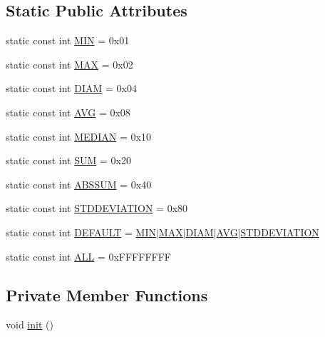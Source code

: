 \subsection*{Static Public Attributes}
\begin{CompactItemize}
\item 
static const int \hyperlink{class_num_set_stats_a650f090e33b5d6e21b4cb20d567d7d4}{MIN} = 0x01
\item 
static const int \hyperlink{class_num_set_stats_b9a7841be40024bbf113e9c936b3deab}{MAX} = 0x02
\item 
static const int \hyperlink{class_num_set_stats_b1820301209131d98f7cfab065d0440f}{DIAM} = 0x04
\item 
static const int \hyperlink{class_num_set_stats_c862317b59207332f5e0c8542ca31ce6}{AVG} = 0x08
\item 
static const int \hyperlink{class_num_set_stats_cc13e2095d277cf2e864e0fcb9504014}{MEDIAN} = 0x10
\item 
static const int \hyperlink{class_num_set_stats_d6d1e1e12eb76587059af855219f02a3}{SUM} = 0x20
\item 
static const int \hyperlink{class_num_set_stats_afd3e476b938988fc3ed9aef347d83f8}{ABSSUM} = 0x40
\item 
static const int \hyperlink{class_num_set_stats_e7880d38dc58838bda30a0554ef7af59}{STDDEVIATION} = 0x80
\item 
static const int \hyperlink{class_num_set_stats_0d368de57b461369635aced38be32b25}{DEFAULT} = \hyperlink{class_num_set_stats_a650f090e33b5d6e21b4cb20d567d7d4}{MIN}$|$\hyperlink{class_num_set_stats_b9a7841be40024bbf113e9c936b3deab}{MAX}$|$\hyperlink{class_num_set_stats_b1820301209131d98f7cfab065d0440f}{DIAM}$|$\hyperlink{class_num_set_stats_c862317b59207332f5e0c8542ca31ce6}{AVG}$|$\hyperlink{class_num_set_stats_e7880d38dc58838bda30a0554ef7af59}{STDDEVIATION}
\item 
static const int \hyperlink{class_num_set_stats_4e4f9d0b733c13f3c6feb99cde24bcec}{ALL} = 0xFFFFFFFF
\end{CompactItemize}
\subsection*{Private Member Functions}
\begin{CompactItemize}
\item 
void \hyperlink{class_num_set_stats_c16a5891e33db010aac26d062de620fd}{init} ()
\end{CompactItemize}
